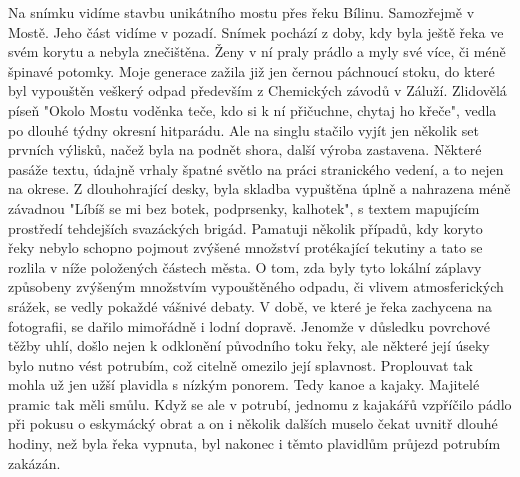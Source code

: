 
Na snímku vidíme stavbu unikátního mostu přes řeku Bílinu. Samozřejmě
v Mostě. Jeho část vidíme v pozadí. Snímek pochází z doby, kdy byla
ještě řeka ve svém korytu a nebyla znečištěna. Ženy v ní praly prádlo
a myly své více, či méně špinavé potomky. Moje generace zažila již jen
černou páchnoucí stoku, do které byl vypouštěn veškerý odpad především
z Chemických závodů v Záluží. Zlidovělá píseň "Okolo Mostu voděnka
teče, kdo si k ní přičuchne, chytaj ho křeče", vedla po dlouhé týdny
okresní hitparádu. Ale na singlu stačilo vyjít jen několik set prvních
výlisků, načež byla na podnět shora, další výroba zastavena. Některé
pasáže textu, údajně vrhaly špatné světlo na práci stranického vedení,
a to nejen na okrese. Z dlouhohrající desky, byla skladba vypuštěna
úplně a nahrazena méně závadnou "Líbíš se mi bez botek, podprsenky,
kalhotek", s textem mapujícím prostředí tehdejších svazáckých brigád.
Pamatuji několik případů, kdy koryto řeky nebylo schopno pojmout
zvýšené množství protékající tekutiny a tato se rozlila v níže
položených částech města. O tom, zda byly tyto lokální záplavy
způsobeny zvýšeným množstvím vypouštěného odpadu, či vlivem
atmosferických srážek, se vedly pokaždé vášnivé debaty. V době, ve
které je řeka zachycena na fotografii, se dařilo mimořádně i lodní
dopravě. Jenomže v důsledku povrchové těžby uhlí, došlo nejen k
odklonění původního toku řeky, ale některé její úseky bylo nutno vést
potrubím, což citelně omezilo její splavnost. Proplouvat tak mohla už
jen užší plavidla s nízkým ponorem. Tedy kanoe a kajaky. Majitelé
pramic tak měli smůlu. Když se ale v potrubí, jednomu z kajakářů
vzpříčilo pádlo při pokusu o eskymácký obrat a on i několik dalších
muselo čekat uvnitř dlouhé hodiny, než byla řeka vypnuta, byl nakonec
i těmto plavidlům průjezd potrubím zakázán.
